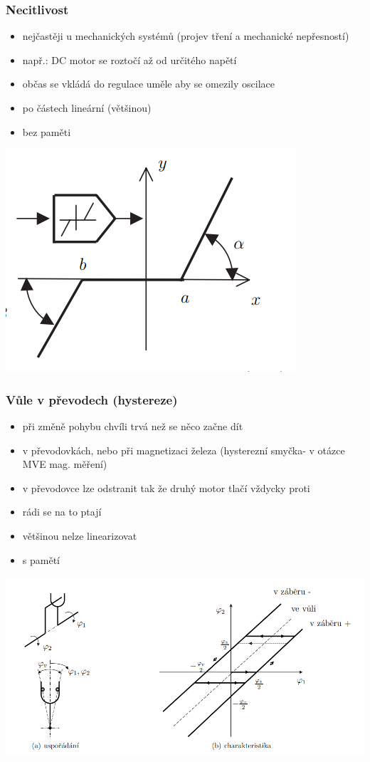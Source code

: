 \subsubsection*{Necitlivost}
\begin{itemize}
    \item nejčastěji u mechanických systémů (projev tření a mechanické nepřesností)
    \item např.: DC motor se roztočí až od určitého napětí
    \item občas se vkládá do regulace uměle aby se omezily oscilace
    \item po částech lineární (většinou)
    \item bez paměti
\end{itemize}
\includegraphics{img/necitlivost.png}

\subsubsection*{Vůle v převodech (hystereze)}
\begin{itemize}
    \item při změně pohybu chvíli trvá než se něco začne dít
    \item v převodovkách, nebo při magnetizaci železa (hysterezní smyčka- v otázce MVE mag. měření)
    \item v převodovce lze odstranit tak že druhý motor tlačí vždycky proti
    \item rádi se na to ptají
    \item většinou nelze linearizovat
    \item s pamětí
\end{itemize}
\includegraphics{img/vule.png}

